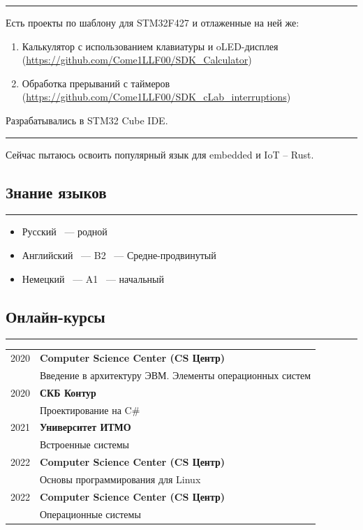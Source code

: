 \documentclass[10pt, final, twoside]{article}
\begin{document}
\par\noindent\rule{\textwidth}{0.1pt}

Есть проекты по шаблону для STM32F427 и отлаженные на ней же:
\begin{enumerate}
  \item Калькулятор с использованием клавиатуры и oLED-дисплея (\url{https://github.com/Come1LLF00/SDK_Calculator})
  \item Обработка прерываний с таймеров (\url{https://github.com/Come1LLF00/SDK_cLab_interruptions})
\end{enumerate}
Разрабатывались в STM32 Cube IDE.

\par\noindent\rule{\textwidth}{0.1pt}

Сейчас пытаюсь освоить популярный язык для embedded и IoT -- Rust.
  
  \subsection*{\textcolor{darkgray2}{Знание языков}}
  \vspace*{-5.5mm}
  \par\noindent\rule{\textwidth}{0.1pt}
  \begin{itemize}
    \item Русский ~--- родной
    \item Английский ~--- B2 ~--- Средне-продвинутый
    \item Немецкий ~--- A1 ~--- начальный
  \end{itemize}

  \subsection*{\textcolor{darkgray2}{Онлайн-курсы}}
  \vspace*{-5.5mm}
  \par\noindent\rule{\textwidth}{0.1pt}
  \begin{table}[H]
    \begin{tabular}{ll}
      2020 & \textbf{Computer Science Center (CS Центр)}\\
           & Введение в архитектуру ЭВМ. Элементы операционных систем\\\hline
      2020 & \textbf{СКБ Контур}\\
           & Проектирование на C\#\\\hline
      2021 & \textbf{Университет ИТМО}\\
           & Встроенные системы\\\hline
      2022 & \textbf{Computer Science Center (CS Центр)}\\
           & Основы программирования для Linux\\\hline
      2022 & \textbf{Computer Science Center (CS Центр)}\\
           & Операционные системы\\\hline
    \end{tabular}
  \end{table}
\end{document}
